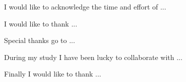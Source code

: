 \begin{acknowledgements}
	I would like to acknowledge the time and effort of ...
	
	I would like to thank ...  
	
	Special thanks go to ...
	
	During my study I have been lucky to collaborate with ...
	
	Finally I would like to thank ...
	 
\end{acknowledgements}